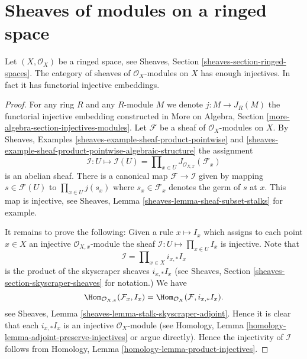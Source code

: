 \section{Sheaves of modules on a ringed space}
\label{section-sheaves-modules-space}


\begin{lemma}
\label{lemma-sheaves-modules-space}
Let $(X, \mathcal{O}_X)$ be a ringed space, see
Sheaves, Section \ref{sheaves-section-ringed-spaces}.
The category of sheaves of $\mathcal{O}_X$-modules on $X$
has enough injectives. In fact it has functorial injective embeddings.
\end{lemma}

\begin{proof}
For any ring $R$ and any $R$-module $M$ we denote
$j : M \to J_R(M)$ the functorial
injective embedding constructed in
More on Algebra, Section \ref{more-algebra-section-injectives-modules}.
Let $\mathcal{F}$ be a sheaf of $\mathcal{O}_X$-modules on $X$.
By Sheaves, Examples \ref{sheaves-example-sheaf-product-pointwise}
and \ref{sheaves-example-sheaf-product-pointwise-algebraic-structure}
the assignment
$$
\mathcal{I} : U \mapsto
\mathcal{I}(U) = \prod\nolimits_{x\in U} J_{\mathcal{O}_{X, x}}(\mathcal{F}_x)
$$
is an abelian sheaf.
There is a canonical map $\mathcal{F} \to \mathcal{I}$
given by mapping $s \in \mathcal{F}(U)$ to $\prod_{x \in U} j(s_x)$
where $s_x \in \mathcal{F}_x$ denotes the germ of $s$ at $x$.
This map is injective, see
Sheaves, Lemma \ref{sheaves-lemma-sheaf-subset-stalks}
for example.

\medskip\noindent
It remains to prove the following: Given a rule
$x \mapsto I_x$ which assigns to each point $x \in X$ an injective
$\mathcal{O}_{X, x}$-module
the sheaf $\mathcal{I} : U \mapsto \prod_{x \in U} I_x$
is injective. Note that
$$
\mathcal{I} = \prod\nolimits_{x \in X} i_{x, *}I_x
$$
is the product of the skyscraper sheaves $i_{x, *}I_x$ (see
Sheaves, Section \ref{sheaves-section-skyscraper-sheaves} for notation.)
We have
$$
\Hom_{\mathcal{O}_{X, x}}(\mathcal{F}_x, I_x)
=
\Hom_{\mathcal{O}_X}(\mathcal{F}, i_{x, *}I_x).
$$
see Sheaves, Lemma \ref{sheaves-lemma-stalk-skyscraper-adjoint}. Hence it is
clear that each $i_{x, *}I_x$ is an injective $\mathcal{O}_X$-module
(see Homology, Lemma \ref{homology-lemma-adjoint-preserve-injectives} or argue
directly). Hence the injectivity of $\mathcal{I}$ follows from
Homology, Lemma \ref{homology-lemma-product-injectives}.
\end{proof}













